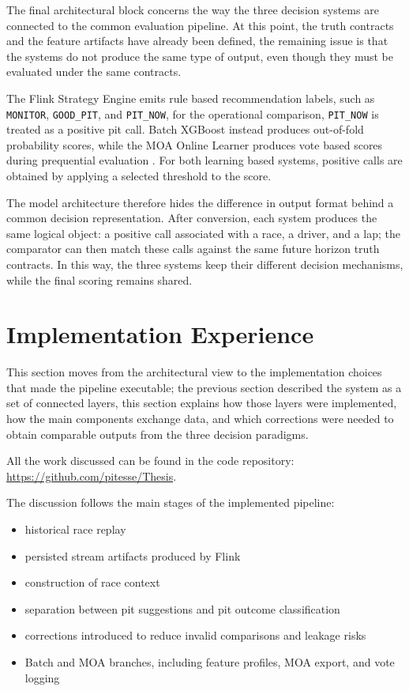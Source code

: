 The final architectural block concerns the way the three decision systems are connected to the common evaluation pipeline. At this point,
the truth contracts and the feature artifacts have already been defined, the remaining issue is that the systems do not produce the same type of output, even though they
must be evaluated under the same contracts.

The Flink Strategy Engine emits rule based recommendation labels, such as \texttt{MONITOR}, \texttt{GOOD\_PIT}, and \texttt{PIT\_NOW}, for the operational comparison,
\texttt{PIT\_NOW} is treated as a positive pit call. Batch XGBoost instead produces out-of-fold probability scores, while the MOA Online Learner produces vote based
scores during prequential evaluation \cite{chen2016xgboost,bifet2010moa,oza2005boosting}. For both learning based systems, positive calls are obtained by applying a selected 
threshold to the score.

The model architecture therefore hides the difference in output format behind a common decision representation. After conversion, each system produces the same logical
object: a positive call associated with a race, a driver, and a lap; the comparator can then match these calls against the same future horizon truth contracts.
In this way, the three systems keep their different decision mechanisms, while the final scoring remains shared.

\newpage
\section{Implementation Experience}

This section moves from the architectural view to the implementation choices that made the pipeline executable; the previous section described the system as a set of connected
layers, this section explains how those layers were implemented, how the main components exchange data, and which corrections were needed to obtain comparable outputs from the
three decision paradigms.

All the work discussed can be found in the code repository: \url{https://github.com/pitesse/Thesis}.

The discussion follows the main stages of the implemented pipeline:
\begin{itemize}
    \item historical race replay
    \item persisted stream artifacts produced by Flink
    \item construction of race context
    \item separation between pit suggestions and pit outcome classification
    \item corrections introduced to reduce invalid comparisons and leakage risks
    \item Batch and MOA branches, including feature profiles, MOA export, and vote logging
\end{itemize}

